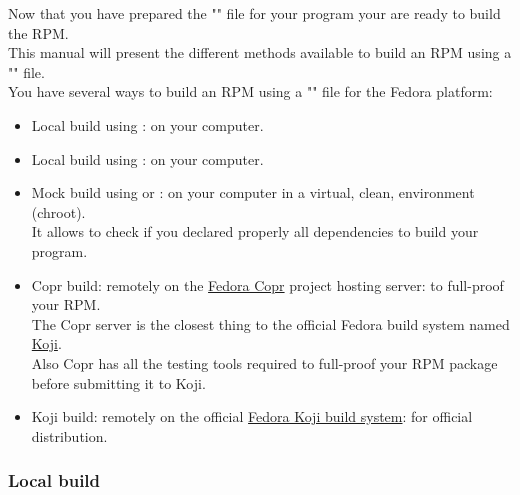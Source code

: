 Now that you have prepared the "" file for your program your are ready to build the RPM. \\
This manual will present the different methods available to build an RPM using a "" file. \\[0.25cm]
You have several ways to build an RPM using a "" file for the Fedora platform:
\begin{itemize}
\item Local build using : on your computer.
\item Local build using : on your computer.
\item Mock build using  or : on your computer in a virtual, clean, environment (chroot).\\ 
It allows to check if you declared properly all dependencies to build your program.
\item Copr build: remotely on the \href{https://copr.fedorainfracloud.org}{Fedora Copr} project hosting server: to full-proof your RPM. \\
The Copr server is the closest thing to the official Fedora build system named \href{https://koji.fedoraproject.org/koji}{Koji}. \\
Also Copr has all the testing tools required to full-proof your RPM package before submitting it to Koji. 
\item Koji build: remotely on the official \href{https://koji.fedoraproject.org/koji}{Fedora Koji build system}: for official distribution.
\end{itemize}

\subsubsection{Local build}

